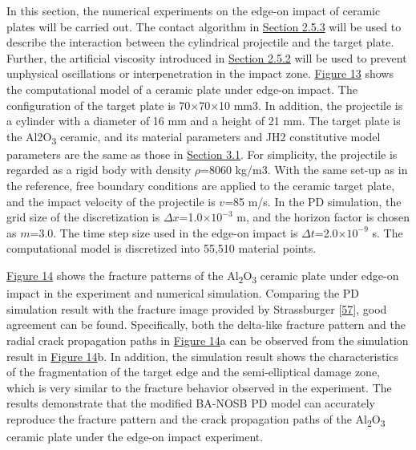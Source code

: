 \documentclass[11pt]{article}
\begin{document}
In this section, the numerical experiments on the edge-on impact of ceramic plates will be carried out. The contact algorithm in \href{https://pmc.ncbi.nlm.nih.gov/articles/PMC10254440/?utm_source=chatgpt.com\#sec2dot5dot3-materials-16-04050}{Section 2.5.3} will be used to describe the interaction between the cylindrical projectile and the target plate. Further, the artificial viscosity introduced in \href{https://pmc.ncbi.nlm.nih.gov/articles/PMC10254440/?utm_source=chatgpt.com\#sec2dot5dot2-materials-16-04050}{Section 2.5.2} will be used to prevent unphysical oscillations or interpenetration in the impact zone. \href{https://pmc.ncbi.nlm.nih.gov/articles/PMC10254440/?utm_source=chatgpt.com\#materials-16-04050-f013}{Figure 13} shows the computational model of a ceramic plate under edge-on impact. The configuration of the target plate is 70\(\times\)70\(\times\)10 mm3. In addition, the projectile is a cylinder with a diameter of 16 mm and a height of 21 mm. The target plate is the Al2O\textsubscript{3} ceramic, and its material parameters and JH2 constitutive model parameters are the same as those in \href{https://pmc.ncbi.nlm.nih.gov/articles/PMC10254440/?utm_source=chatgpt.com\#sec3dot1-materials-16-04050}{Section 3.1}. For simplicity, the projectile is regarded as a rigid body with density \(\rho\)=8060 kg/m3. With the same set-up as in the reference, free boundary conditions are applied to the ceramic target plate, and the impact velocity of the projectile is \(v\)=85 m/s. In the PD simulation, the grid size of the discretization is \(\Delta\)\(x\)=1.0\(\times\)\(10^{-3}\) m, and the horizon factor is chosen as \(m\)=3.0. The time step size used in the edge-on impact is \(\Delta\)\(t\)=2.0\(\times\)\(10^{-9}\) s. The computational model is discretized into 55,510 material points.

\href{https://pmc.ncbi.nlm.nih.gov/articles/PMC10254440/?utm_source=chatgpt.com\#materials-16-04050-f014}{Figure 14} shows the fracture patterns of the Al\textsubscript{2}O\textsubscript{3} ceramic plate under edge-on impact in the experiment and numerical simulation. Comparing the PD simulation result with the fracture image provided by Strassburger {[}\href{https://pmc.ncbi.nlm.nih.gov/articles/PMC10254440/?utm_source=chatgpt.com\#B57-materials-16-04050}{57}{]}, good agreement can be found. Specifically, both the delta-like fracture pattern and the radial crack propagation paths in \href{https://pmc.ncbi.nlm.nih.gov/articles/PMC10254440/?utm_source=chatgpt.com\#materials-16-04050-f014}{Figure 14}a can be observed from the simulation result in \href{https://pmc.ncbi.nlm.nih.gov/articles/PMC10254440/?utm_source=chatgpt.com\#materials-16-04050-f014}{Figure 14}b. In addition, the simulation result shows the characteristics of the fragmentation of the target edge and the semi-elliptical damage zone, which is very similar to the fracture behavior observed in the experiment. The results demonstrate that the modified BA-NOSB PD model can accurately reproduce the fracture pattern and the crack propagation paths of the Al\textsubscript{2}O\textsubscript{3} ceramic plate under the edge-on impact experiment.
\end{document}
